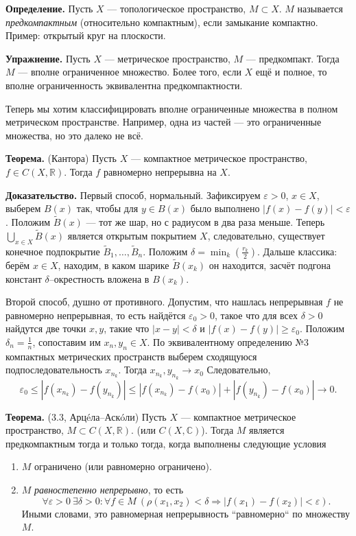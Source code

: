 \QED

\textbf{Определение.} Пусть $X$ --- топологическое пространство, $M \subset X$.
$M$ называется \textit{предкомпактным} (относительно компактным), если замыкание компактно.
Пример: открытый круг на плоскости.

\textbf{Упражнение.} Пусть $X$ --- метрическое пространство, $M$ --- предкомпакт.
Тогда $M$ --- вполне ограниченное множество.
Более того, если $X$ ещё и полное, то вполне ограниченность эквивалентна предкомпактности.

Теперь мы хотим классифицировать вполне ограниченные множества в полном метрическом пространстве.
Например, одна из частей --- это ограниченные множества, но это далеко не всё.

\textbf{Теорема.} (Кантора) Пусть $X$ --- компактное метрическое пространство, $f \in C(X, \mathbb R)$.
Тогда $f$ равномерно непрерывна на $X$.

\textbf{Доказательство.} Первый способ, нормальный.
Зафиксируем $\varepsilon > 0$, $x \in X$, выберем $B(x)$ так, чтобы для $y \in B(x)$ было выполнено $|f(x) - f(y)| < \varepsilon$.
Положим $\tilde B(x)$ --- тот же шар, но с радиусом в два раза меньше.
Теперь $\bigcup_{x \in X} \tilde B(x)$ является открытым покрытием $X$, следовательно, существует конечное подпокрытие $\tilde B_1, \dots, \tilde B_n$.
Положим $\delta = \min_{k} \left( \frac{r_k}{2} \right)$.
Дальше классика: берём $x \in X$, находим, в каком шарике $\tilde B(x_k)$ он находится, засчёт подгона констант $\delta$--окрестность вложена в $B(x_k)$.

Второй способ, душно от противного.
Допустим, что нашлась непрерывная $f$ не равномерно непрерывная, то есть найдётся $\varepsilon_0 > 0$, такое что для всех $\delta > 0$ найдутся две точки $x, y$, такие что $|x - y| < \delta$ и $|f(x) - f(y)| \ge \varepsilon_0$.
Положим $\delta_n = \frac{1}{n}$, сопоставим им $x_n, y_n \in X$.
По эквивалентному определению №3 компактных метрических пространств выберем сходящуюся подпоследовательность $x_{n_k}$.
Тогда $x_{n_k}, y_{n_k} \to x_0$
Следовательно,
\[
    \varepsilon_0 \le |f(x_{n_k}) - f(y_{n_k})| \le |f(x_{n_k}) - f(x_0)| + |f(y_{n_k}) - f(x_0)| \to 0.
\]

\QED

\textbf{Теорема.} (3.3, Арцéла--Аскóли) Пусть $X$ --- компактное метрическое пространство, $M \subset C(X, \mathbb R)$. (или $C(X, \mathbb C)$).
Тогда $M$ является предкомпактным тогда и только тогда, когда выполнены следующие условия
\begin{enumerate}
    \item $M$ ограничено (или равномерно ограничено).
    \item $M$ \textit{равностепенно непрерывно}, то есть
        \[
            \forall \varepsilon > 0~\exists \delta > 0: \forall f \in M~(\rho(x_1, x_2) < \delta \Rightarrow |f(x_1) - f(x_2)| < \varepsilon).
        \]
        Иными словами, это равномерная непрерывность ``равномерно`` по множеству $M$.
\end{enumerate}


